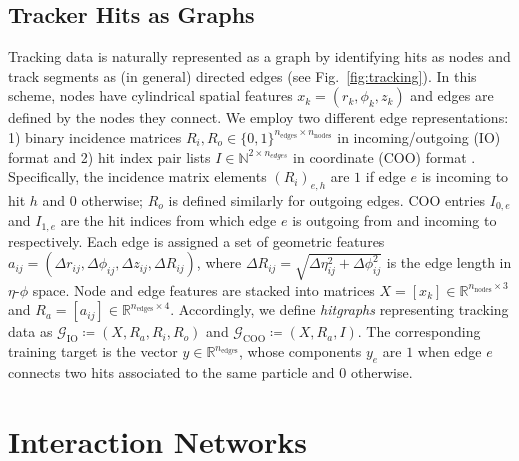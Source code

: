 \documentclass[twocolumn]{svjour3}
\newcommand{\nnodes}{\ensuremath{n_\mathrm{nodes}\xspace}}
\newcommand{\nedges}{\ensuremath{n_\mathrm{edges}\xspace}}
\begin{document}
\subsection{Tracker Hits as Graphs}
Tracking data is naturally represented as a graph by identifying hits as nodes and track segments as (in general) directed edges (see Fig.~\ref{fig:tracking}). 
In this scheme, nodes have cylindrical spatial features $x_k=(r_k,\phi_k,z_k)$ and edges are defined by the nodes they connect.
We employ two different edge representations: 1) binary incidence matrices $R_i, R_o\in\{0,1\}^{\nedges\times \nnodes}$ in incoming/outgoing (IO) format and 2) hit index pair lists $I\in\mathbb{N}^{2\times n_{edges}}$ in coordinate (COO) format \cite{fey2019fast}.
Specifically, the incidence matrix elements $(R_i)_{e,h}$ are $1$ if edge $e$ is incoming to hit $h$ and $0$ otherwise; $R_o$ is defined similarly for outgoing edges. 
COO entries $I_{0,e}$ and $I_{1,e}$ are the hit indices from which edge $e$ is outgoing from and incoming to respectively.
Each edge is assigned a set of geometric features $a_{ij} = (\Delta r_{ij}, \Delta \phi_{ij}, \Delta z_{ij}, \Delta R_{ij})$, where $\Delta R_{ij}=\sqrt{\Delta\eta_{ij}^2 + \Delta\phi_{ij}^2}$ is the edge length in $\eta$-$\phi$ space. 
Node and edge features are stacked into matrices $X = [x_k]\in\mathbb{R}^{\nnodes\times 3}$ and $R_a=[a_{ij}]\in\mathbb R^{\nedges\times 4}$. 
Accordingly, we define \textit{hitgraphs} representing tracking data as $\mathcal{G}_\mathrm{IO}\coloneqq (X, R_a, R_i, R_o)$ and $\mathcal{G}_\mathrm{COO}\coloneqq (X,R_a,I)$. 
The corresponding training target is the vector $y\in\mathbb{R}^{\nedges}$, whose components $y_e$ are $1$ when edge $e$ connects two hits associated to the same particle and $0$ otherwise.

\section{Interaction Networks}
\label{sec:IN}
\end{document}
